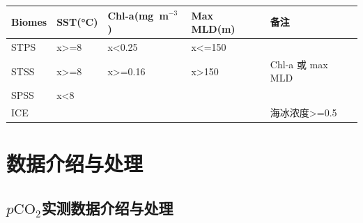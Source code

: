 \begin{table}[htbp]
\begin{tabularx}{\textwidth}{XXXXX}
\toprule
Biomes & SST(°C) & Chl-a(mg\ m$^{-3}$) & Max MLD(m) & 备注 \\
\midrule
STPS   & x\textgreater{}=8 & x\textless{}0.25 & x\textless{}=150 & \\
STSS   & x\textgreater{}=8 & x\textgreater{}=0.16 & x\textgreater{}150 &  Chl-a 或 max MLD \\
SPSS   & x\textless{}8     & & & \\
ICE    & & & & 海冰浓度\textgreater{}=0.5 \\
\bottomrule
\end{tabularx}
\end{table}

\section{数据介绍与处理}
\subsection{\texorpdfstring{$p\mathrm{CO_2}$}{}实测数据介绍与处理}
